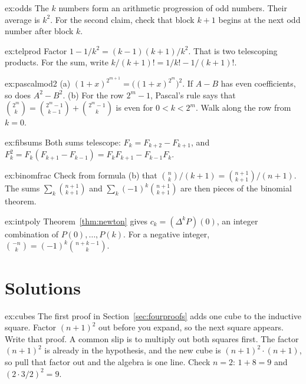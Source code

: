 \begin{hint}{ex:odds}
The $k$ numbers form an arithmetic progression of odd numbers. Their average is $k^2$. For the second claim, check that block $k+1$ begins at the next odd number after block $k$.
\end{hint}
\begin{hint}{ex:telprod}
Factor $1-1/k^2=(k-1)(k+1)/k^2$. That is two telescoping products. For the sum, write $k/(k+1)!=1/k!-1/(k+1)!$.
\end{hint}
\begin{hint}{ex:pascalmod2}
(a) $(1+x)^{2^{m+1}}=\bigl((1+x)^{2^m}\bigr)^2$. If $A-B$ has even coefficients, so does $A^2-B^2$. (b) For the row $2^m-1$, Pascal's rule says that $\binom{2^m}{k}=\binom{2^m-1}{k-1}+\binom{2^m-1}{k}$ is even for $0<k<2^m$. Walk along the row from $k=0$.
\end{hint}
\begin{hint}{ex:fibsums}
Both sums telescope: $F_k=F_{k+2}-F_{k+1}$, and $F_k^2=F_k(F_{k+1}-F_{k-1})=F_k F_{k+1}-F_{k-1}F_k$.
\end{hint}
\begin{hint}{ex:binomfrac}
Check from formula (b) that $\binom nk/(k+1)=\binom{n+1}{k+1}/(n+1)$. The sums $\sum_k\binom{n+1}{k+1}$ and $\sum_k(-1)^k\binom{n+1}{k+1}$ are then pieces of the binomial theorem.
\end{hint}
\begin{hint}{ex:intpoly}
Theorem~\ref{thm:newton} gives $c_k=(\Delta^k P)(0)$, an integer combination of $P(0),\dots,P(k)$. For a negative integer, $\binom{-n}{k}=(-1)^k\binom{n+k-1}{k}$.
\end{hint}

\section{Solutions}

\begin{solution}{ex:cubes}
\idea The first proof in Section~\ref{sec:fourproofs} adds one cube to the inductive square. Factor $(n+1)^2$ out before you expand, so the next square appears.
\writeup Write that proof. A common slip is to multiply out both squares first. The factor $(n+1)^2$ is already in the hypothesis, and the new cube is $(n+1)^2\cdot(n+1)$, so pull that factor out and the algebra is one line. Check $n=2$: $1+8=9$ and $(2\cdot3/2)^2=9$.
\end{solution}

